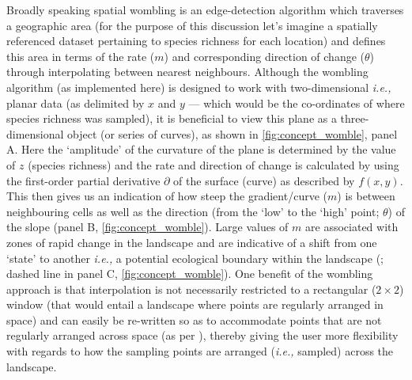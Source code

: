 \begin{refsection}
Broadly speaking spatial wombling is an edge-detection algorithm which
traverses a geographic area (for the purpose of this discussion let's
imagine a spatially referenced dataset pertaining to species richness
for each location) and defines this area in terms of the rate ($m$)
and corresponding direction of change ($\theta$) through interpolating
between nearest neighbours. Although the wombling algorithm (as
implemented here) is designed to work with two-dimensional \emph{i.e.,}
planar data (as delimited by $x$ and $y$ --- which would be the
co-ordinates of where species richness was sampled), it is beneficial to
view this plane as a three-dimensional object (or series of curves), as
shown in \autoref{fig:concept_womble}, panel A. Here the `amplitude' of the curvature of
the plane is determined by the value of $z$ (species richness) and the
rate and direction of change is calculated by using the first-order
partial derivative $\partial$ of the surface (curve) as described by
$f(x,y)$. This then gives us an indication of how steep the
gradient/curve ($m$) is between neighbouring cells as well as the
direction (from the `low' to the `high' point; $\theta$) of the slope
(panel B, \autoref{fig:concept_womble}). Large values of $m$ are associated with zones
of rapid change in the landscape and are indicative of a shift from one
`state' to another \emph{i.e.,} a potential ecological boundary within
the landscape (\cite{Fortin2005SpaAna}; dashed line in panel C,
\autoref{fig:concept_womble}). One benefit of the wombling approach is that
interpolation is not necessarily restricted to a rectangular
($2 \times 2$) window (that would entail a landscape where points are
regularly arranged in space) and can easily be re-written so as to
accommodate points that are not regularly arranged across space (as per
\cite{Fortin1994EdgDet}), thereby giving the user more flexibility with
regards to how the sampling points are arranged (\emph{i.e.,} sampled)
across the landscape.


\end{refsection}

